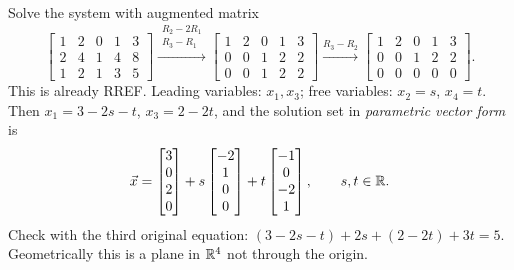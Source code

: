 \begin{example}
Solve the system with augmented matrix
\[
\left[\begin{array}{cccc|c} 1&2&0&1&3\\ 2&4&1&4&8\\ 1&2&1&3&5\end{array}\right]
\xrightarrow{\substack{R_2-2R_1\\R_3-R_1}}
\left[\begin{array}{cccc|c} 1&2&0&1&3\\ 0&0&1&2&2\\ 0&0&1&2&2\end{array}\right]
\xrightarrow{R_3-R_2}
\left[\begin{array}{cccc|c} 1&2&0&1&3\\ 0&0&1&2&2\\ 0&0&0&0&0\end{array}\right].
\]
This is already RREF. Leading variables: $x_1,x_3$; free variables: $x_2=s$, $x_4=t$. Then
$x_1 = 3-2s-t$, $x_3 = 2-2t$, and the solution set in \emph{parametric vector form} is
\[
  \vec x = \begin{bmatrix}3\\0\\2\\0\end{bmatrix}
         + s\begin{bmatrix}-2\\1\\0\\0\end{bmatrix}
         + t\begin{bmatrix}-1\\0\\-2\\1\end{bmatrix},\qquad s,t\in\mathbb{R} .
\]
Check with the third original equation: $(3-2s-t)+2s+(2-2t)+3t = 5$. Geometrically this is a
plane in $\mathbb{R}^4$ not through the origin.
\end{example}

